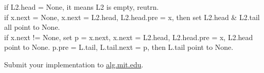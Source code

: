 \documentclass[12pt,twoside]{article}
\begin{document}
\begin{problems}
\begin{problemparts}
\problempart %

if L2.head = None, it means L2 is empty, reutrn.\\
if x.next = None, x.next = L2.head, L2.head.pre = x, then set L2.head \& L2.tail all point to None. \\
if x.next != None, set p = x.next, x.next = L2.head, L2.head.pre = x, L2.head point to None. p.pre = L.tail, L.tail.next = p, then L.tail point to None.

\problempart Submit your implementation to {\small\url{alg.mit.edu}}.
\end{problemparts}

\end{problems}
\end{document}
